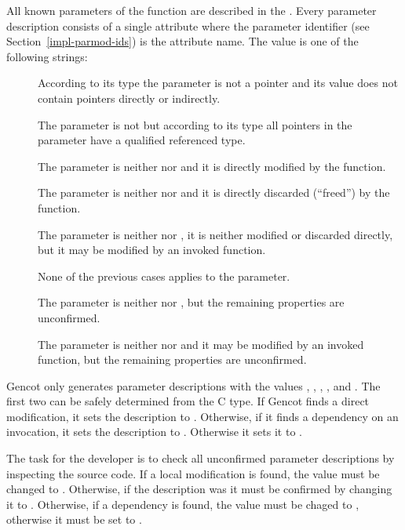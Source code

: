 All known parameters of the function are described in the . 
Every parameter description consists of a single attribute where the parameter identifier (see Section~\ref{impl-parmod-ids})
is the attribute name. The value is one of the following strings:
\begin{description}
\item[] According to its type the parameter is not a pointer and its value does not contain pointers directly or
indirectly.
\item[] The parameter is not  but according to its type all pointers in the parameter have a  qualified referenced type.
\item[] The parameter is neither  nor  and it is directly modified by the function.
\item[] The parameter is neither  nor  and it is directly discarded 
(``freed'') by the function. 
\item[] The parameter is neither  nor , it is neither modified 
or discarded directly, but it may be modified by an invoked function. 
\item[] None of the previous cases applies to the parameter.
\item[] The parameter is neither  nor , but the remaining properties are unconfirmed.
\item[] The parameter is neither  nor  and it may be modified by an invoked function,
but the remaining properties are unconfirmed.
\end{description}

Gencot only generates parameter descriptions with the values , , , , and .
The first two can be safely determined from the C type. If Gencot finds a direct modification, it sets the description to 
. Otherwise, if it finds a dependency on an invocation, it sets the description to . Otherwise
it sets it to .

The task for the developer is to check all unconfirmed parameter descriptions by inspecting the source code. If a local modification
is found, the value must be changed to . Otherwise, if the description was  it must be confirmed 
by changing it to . Otherwise, if a dependency is found, the value  must be chaged to ,
otherwise it must be set to .

